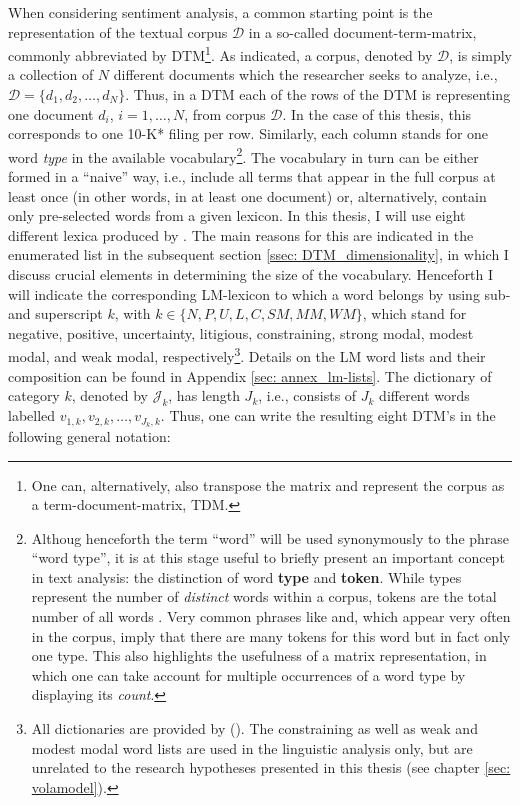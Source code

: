 When considering sentiment analysis, a common starting point is the representation of the textual corpus $\mathcal{D}$ in a so-called document-term-matrix, commonly abbreviated by DTM\footnote{One can, alternatively, also transpose the matrix and represent the corpus as a term-document-matrix, TDM.}. As indicated, a corpus, denoted by $\mathcal{D}$, is simply a collection of $N$ different documents which the researcher seeks to analyze, i.e., $\mathcal{D}  = \{d_1, d_2, \dots, d_N \}$. Thus, in a DTM each of the rows of the DTM is representing one document $d_i$, $i = 1, \dots, N$, from corpus $\mathcal{D}$. In the case of this thesis, this corresponds to one 10-K* filing per row. Similarly, each column stands for one word \textit{type} in the available vocabulary\footnote{Althoug henceforth the term \enquote{word} will be used synonymously to the phrase \enquote{word type}, it is at this stage useful to briefly present an important concept in text analysis: the distinction of word \textbf{type} and \textbf{token}. While types represent the number of \textit{distinct} words within a corpus, tokens are the total number of all words \parencite{Jurafsky_Draft_2017}. Very common phrases like \textsf{and}, which appear very often in the corpus, imply that there are many tokens for this word but in fact only one type. This also highlights the usefulness of a matrix representation, in which one can take account for multiple occurrences of a word type by displaying its \textit{count}.}. The vocabulary in turn can be either formed in a \enquote{naive} way, i.e., include all terms that appear in the full corpus at least once (in other words, in at least one document) or, alternatively, contain only pre-selected words from a given lexicon. In this thesis, I will use eight different lexica produced by \textcite{Loughran2011}. The main reasons for this are indicated in the enumerated list in the subsequent section \ref{ssec: DTM_dimensionality}, in which I discuss crucial elements in determining the size of the vocabulary. Henceforth I will indicate the corresponding LM-lexicon to which a word belongs by using sub- and superscript $k$, with $k \in \{N, P, U, L, C, SM, MM, WM\}$, which stand for negative, positive, uncertainty, litigious, constraining, strong modal, modest modal, and weak modal, respectively\footnote{All dictionaries are provided by \textcite{Loughran2011} (\myurl). The constraining as well as weak and modest modal word lists are used in the linguistic analysis only, but are unrelated to the research hypotheses presented in this thesis (see chapter \ref{sec: volamodel}).}. Details on the LM word lists and their composition can be found in Appendix \ref{sec: annex_lm-lists}. The dictionary of category $k$, denoted by $\mathcal{J}_k$, has length $J_k$, i.e., consists of $J_k$ different words labelled $v_{1,k}, v_{2,k}, \dots, v_{J_{k},k}$. Thus, one can write the resulting eight DTM's in the following general notation:
